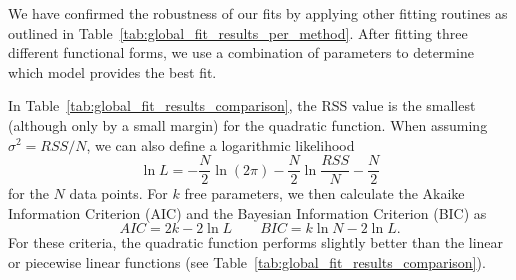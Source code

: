 \documentclass[twocolumn,apj,numberedappendix,appendixfloats,twocolappendix]{openjournal}
\begin{document}
\begin{CJK*}{UTF8}{gbsn}


We have confirmed the robustness of our fits by applying other fitting routines as outlined in Table~\ref{tab:global_fit_results_per_method}. After fitting three different functional forms, we use a combination of parameters to determine which model provides the best fit.

In Table~\ref{tab:global_fit_results_comparison}, the RSS value is the smallest (although only by a small margin) for the quadratic function. When assuming $\sigma^2 = RSS / N$, we can also define a logarithmic likelihood
\begin{equation}
    \ln L = - \frac{N}{2} \ln (2 \pi) - \frac{N}{2} \ln \frac{RSS}{N} - \frac{N}{2}
\end{equation}
for the $N$ data points. For $k$ free parameters, we then calculate the Akaike Information Criterion (AIC) and the Bayesian Information Criterion (BIC) as
\begin{equation} \label{eq:aic_bic}
    AIC = 2 k  - 2 \ln L \qquad BIC = k \ln N - 2 \ln L.
\end{equation}
For these criteria, the quadratic function performs slightly better than the linear or piecewise linear functions (see Table~\ref{tab:global_fit_results_comparison}).




\end{CJK*}
\end{document}
